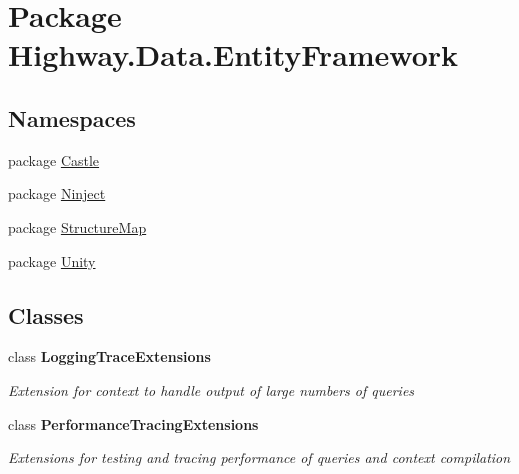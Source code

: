 \hypertarget{namespace_highway_1_1_data_1_1_entity_framework}{\section{Package Highway.\-Data.\-Entity\-Framework}
\label{namespace_highway_1_1_data_1_1_entity_framework}
}
\subsection*{Namespaces}
\begin{DoxyCompactItemize}
\item 
package \hyperlink{namespace_highway_1_1_data_1_1_entity_framework_1_1_castle}{Castle}
\item 
package \hyperlink{namespace_highway_1_1_data_1_1_entity_framework_1_1_ninject}{Ninject}
\item 
package \hyperlink{namespace_highway_1_1_data_1_1_entity_framework_1_1_structure_map}{Structure\-Map}
\item 
package \hyperlink{namespace_highway_1_1_data_1_1_entity_framework_1_1_unity}{Unity}
\end{DoxyCompactItemize}
\subsection*{Classes}
\begin{DoxyCompactItemize}
\item 
class {\bfseries Logging\-Trace\-Extensions}
\begin{DoxyCompactList}\small\item\em Extension for context to handle output of large numbers of queries \end{DoxyCompactList}\item 
class {\bfseries Performance\-Tracing\-Extensions}
\begin{DoxyCompactList}\small\item\em Extensions for testing and tracing performance of queries and context compilation \end{DoxyCompactList}\end{DoxyCompactItemize}
